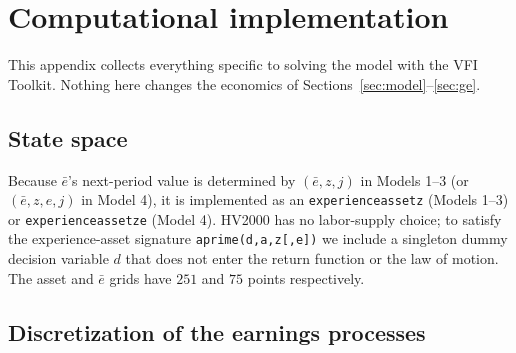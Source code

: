 \documentclass[11pt,fleqn]{article}
\begin{document}
%
% 



\appendix

\section{Computational implementation}\label{sec:computational}

This appendix collects everything specific to solving the model with the VFI Toolkit. Nothing here changes the economics of Sections~\ref{sec:model}--\ref{sec:ge}.

\subsection*{State space}

Because $\bar{e}$'s next-period value is determined by $(\bar{e}, z, j)$ in Models 1--3 (or $(\bar{e}, z, e, j)$ in Model 4), it is implemented as an \texttt{experienceassetz} (Models 1--3) or \texttt{experienceassetze} (Model 4). HV2000 has no labor-supply choice; to satisfy the experience-asset signature \verb|aprime(d,a,z[,e])| we include a singleton dummy decision variable $d$ that does not enter the return function or the law of motion. The asset and $\bar{e}$ grids have $251$ and $75$ points respectively.

\subsection*{Discretization of the earnings processes}
\end{document}
